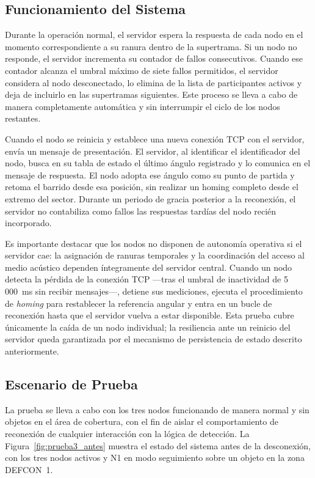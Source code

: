 \subsection{Funcionamiento del Sistema}

Durante la operación normal, el servidor espera la respuesta de cada nodo en el momento correspondiente a su ranura dentro de la supertrama. Si un nodo no responde, el servidor incrementa su contador de fallos consecutivos. Cuando ese contador alcanza el umbral máximo de siete fallos permitidos, el servidor considera al nodo desconectado, lo elimina de la lista de participantes activos y deja de incluirlo en las supertramas siguientes. Este proceso se lleva a cabo de manera completamente automática y sin interrumpir el ciclo de los nodos restantes.

Cuando el nodo se reinicia y establece una nueva conexión TCP con el servidor, envía un mensaje de presentación. El servidor, al identificar el identificador del nodo, busca en su tabla de estado el último ángulo registrado y lo comunica en el mensaje de respuesta. El nodo adopta ese ángulo como su punto de partida y retoma el barrido desde esa posición, sin realizar un homing completo desde el extremo del sector. Durante un periodo de gracia posterior a la reconexión, el servidor no contabiliza como fallos las respuestas tardías del nodo recién incorporado.

Es importante destacar que los nodos no disponen de autonomía operativa si el servidor cae: la asignación de ranuras temporales y la coordinación del acceso al medio acústico dependen íntegramente del servidor central. Cuando un nodo detecta la pérdida de la conexión TCP ---tras el umbral de inactividad de 5\,000~ms sin recibir mensajes---, detiene sus mediciones, ejecuta el procedimiento de \textit{homing} para restablecer la referencia angular y entra en un bucle de reconexión hasta que el servidor vuelva a estar disponible. Esta prueba cubre únicamente la caída de un nodo individual; la resiliencia ante un reinicio del servidor queda garantizada por el mecanismo de persistencia de estado descrito anteriormente.

\subsection{Escenario de Prueba}

La prueba se lleva a cabo con los tres nodos funcionando de manera normal y sin objetos en el área de cobertura, con el fin de aislar el comportamiento de reconexión de cualquier interacción con la lógica de detección. La Figura~\ref{fig:prueba3_antes} muestra el estado del sistema antes de la desconexión, con los tres nodos activos y N1 en modo seguimiento sobre un objeto en la zona DEFCON~1.

